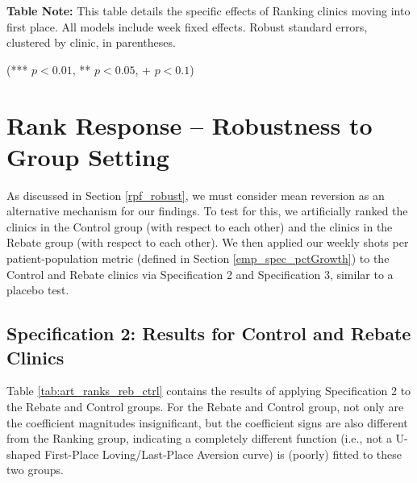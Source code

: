 \begin{table}
{\begin{threeparttable}[t]
    \medskip
    \begin{tablenotes}
      \footnotesize
      \item \textbf{Table Note:} This table details the specific effects of Ranking clinics moving into first place. All models include week fixed effects. Robust standard errors, clustered by clinic, in parentheses.
      \item (*** $p < 0.01$, ** $p < 0.05$, + $p < 0.1$)
    \end{tablenotes}
  \label{tab:sensitivity_def_first}
  \end{threeparttable} }
 \end{table}

\newpage
\section{Rank Response – Robustness to Group Setting} \label{cc_grp_robust}
As discussed in Section \ref{rpf_robust}, we must consider mean reversion as an alternative mechanism for our findings. To test for this, we artificially ranked the clinics in the Control group (with respect to each other) and the clinics in the Rebate group (with respect to each other). We then applied our weekly shots per patient-population metric (defined in Section \ref{emp_spec_pctGrowth}) to the Control and Rebate clinics via Specification 2 and Specification 3, similar to a placebo test. 
\subsection{Specification 2: Results for Control and Rebate Clinics}
Table \ref{tab:art_ranks_reb_ctrl} contains the results of applying Specification 2 to the Rebate and Control groups. For the Rebate and Control group, not only are the coefficient magnitudes insignificant, but the coefficient signs are also different from the Ranking group, indicating a completely different function (i.e., not a U-shaped First-Place Loving/Last-Place Aversion curve) is (poorly) fitted to these two groups.

